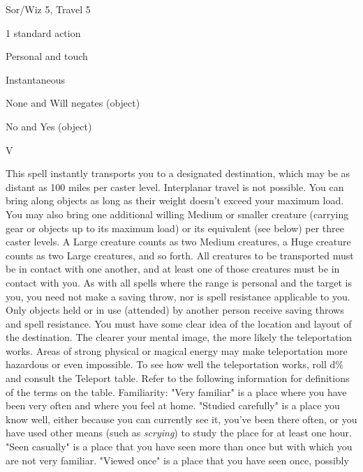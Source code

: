 
\begin{description*}
\item[Level:] Sor/Wiz 5, Travel 5
\item[Casting Time:] 1 standard action
\item[Range:] Personal and touch
\item[Duration:] Instantaneous
\item[Saving Throw:] None and Will negates (object)
\item[Spell Resistance:] No and Yes (object)
\item[Components:] V
\end{description*}

This spell instantly transports you to a designated destination, which may be as
distant as 100 miles per caster level. Interplanar travel is not possible. You
can bring along objects as long as their weight doesn't exceed your maximum load.
You may also bring one additional willing Medium or smaller creature (carrying
gear or objects up to its maximum load) or its equivalent (see below) per three
caster levels. A Large creature counts as two Medium creatures, a Huge creature
counts as two Large creatures, and so forth. All creatures to be transported must
be in contact with one another, and at least one of those creatures must be in
contact with you. As with all spells where the range is personal and the target
is you, you need not make a saving throw, nor is spell resistance applicable to
you. Only objects held or in use (attended) by another person receive saving throws
and spell resistance.
You must have some clear idea of the location and layout of the destination. The
clearer your mental image, the more likely the teleportation works. Areas of strong
physical or magical energy may make teleportation more hazardous or even impossible.
To see how well the teleportation works, roll d\% and consult the Teleport table.
Refer to the following information for definitions of the terms on the table.
Familiarity: "Very familiar" is a place where you have been very often
and where you feel at home. "Studied carefully" is a place you know well, either
because you can currently see it, you've been there often, or you have used other
means (such as \textit{scrying}) to study the place for at least one hour. "Seen
casually" is a place that you have seen more than once but with which you are
not very familiar. "Viewed once" is a place that you have seen once, possibly

